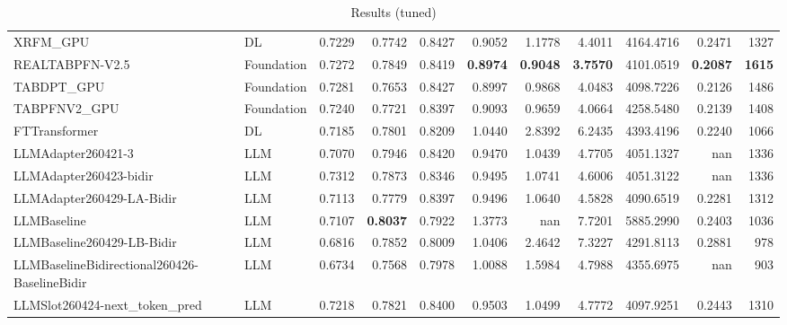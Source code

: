\begin{table}[htbp]
{\begin{tabular}{ll|rrrrrrrr|r}
XRFM\_GPU & DL & 0.7229 & 0.7742 & 0.8427 & 0.9052 & 1.1778 & 4.4011 & 4164.4716 & 0.2471 & 1327 \\
REALTABPFN-V2.5 & Foundation & 0.7272 & 0.7849 & 0.8419 & \textbf{0.8974} & \textbf{0.9048} & \textbf{3.7570} & 4101.0519 & \textbf{0.2087} & \textbf{1615} \\
TABDPT\_GPU & Foundation & 0.7281 & 0.7653 & 0.8427 & 0.8997 & 0.9868 & 4.0483 & 4098.7226 & 0.2126 & 1486 \\
TABPFNV2\_GPU & Foundation & 0.7240 & 0.7721 & 0.8397 & 0.9093 & 0.9659 & 4.0664 & 4258.5480 & 0.2139 & 1408 \\
\midrule
FTTransformer & DL & 0.7185 & 0.7801 & 0.8209 & 1.0440 & 2.8392 & 6.2435 & 4393.4196 & 0.2240 & 1066 \\
LLMAdapter260421-3 & LLM & 0.7070 & 0.7946 & 0.8420 & 0.9470 & 1.0439 & 4.7705 & 4051.1327 & nan & 1336 \\
LLMAdapter260423-bidir & LLM & 0.7312 & 0.7873 & 0.8346 & 0.9495 & 1.0741 & 4.6006 & 4051.3122 & nan & 1336 \\
LLMAdapter260429-LA-Bidir & LLM & 0.7113 & 0.7779 & 0.8397 & 0.9496 & 1.0640 & 4.5828 & 4090.6519 & 0.2281 & 1312 \\
LLMBaseline & LLM & 0.7107 & \textbf{0.8037} & 0.7922 & 1.3773 & nan & 7.7201 & 5885.2990 & 0.2403 & 1036 \\
LLMBaseline260429-LB-Bidir & LLM & 0.6816 & 0.7852 & 0.8009 & 1.0406 & 2.4642 & 7.3227 & 4291.8113 & 0.2881 & 978 \\
LLMBaselineBidirectional260426-BaselineBidir & LLM & 0.6734 & 0.7568 & 0.7978 & 1.0088 & 1.5984 & 4.7988 & 4355.6975 & nan & 903 \\
LLMSlot260424-next\_token\_pred & LLM & 0.7218 & 0.7821 & 0.8400 & 0.9503 & 1.0499 & 4.7772 & 4097.9251 & 0.2443 & 1310 \\
\bottomrule
\end{tabular}
}
\caption{Results (tuned)}
\label{tab:results_tuned}
\end{table}
